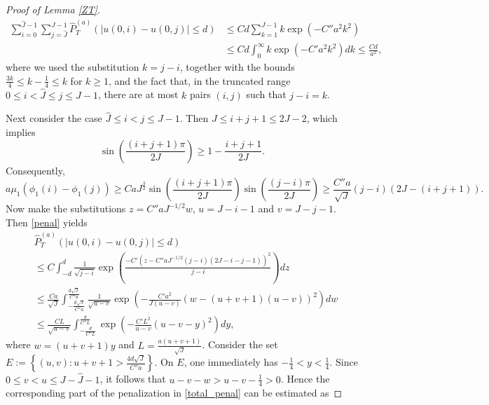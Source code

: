 \documentclass[12pt]{amsart}
\numberwithin{equation}{section}
\newcommand{\1}{\mathbf{1}}
\begin{document}
\begin{proof}[Proof of Lemma \ref{ZT}]
    \begin{equation}
    \label{penal_1}
        \begin{split}
            \sum_{i=0}^{\hat{J}-1}\sum_{j=\hat{J}}^{J-1}\widehat{P}_T^{(a)}(\vert u(0,i)-u(0,j)\vert\leq d)&\leq Cd\sum_{k=1}^{J-1}k\exp\left(-C''a^2k^2\right)\\
            &\leq Cd\int_0^\infty k\exp\left(-C'a^2k^2\right)dk\leq \frac{Cd}{a^2},
        \end{split}
    \end{equation}
    where we used the substitution $k=j-i$, together with the bounds $\frac{3k}{4}\leq k-\frac{1}{4}\leq k$ for $k\geq 1$, and the fact that, in the truncated range $0\le i<\hat{J}\le j\le J-1$, there are at most $k$ pairs $(i,j)$ such that $j-i=k$. 
    
    Next consider the case $\hat{J}\le i<j\le J-1$. Then $J\leq i+j+1\leq2J-2$, which implies
    \begin{equation*}
        \sin\left(\frac{(i+j+1)\pi}{2J}\right)\geq1-\frac{i+j+1}{2J}.
    \end{equation*}
    Consequently,
    \begin{equation*}
        a\mu_1(\phi_1(i)-\phi_1(j))\geq CaJ^{\frac{3}{2}}\sin\left(\frac{(i+j+1)\pi}{2J}\right)\sin\left(\frac{(j-i)\pi}{2J}\right)\geq \frac{C''a}{\sqrt{J}}(j-i)(2J-(i+j+1)).
    \end{equation*}
    Now make the substitutions $z = C''aJ^{-1/2}w$, $u=J-i-1$ and $v=J-j-1$. Then \eqref{penal} yields
    \begin{equation}
    \label{penal_2}
        \begin{split}
            &\widehat{P}^{(a)}_T(|u(0,i)-u(0,j)|\leq d)\\
            &\leq C\int_{-d}^d\frac{1}{\sqrt{j-i}}\exp\left(\frac{-C'(z-C''aJ^{-1/2}(j-i)(2J-i-j-1))^2}{j-i}\right)dz\\
            &\leq \frac{Ca}{\sqrt{J}}\int_{-\frac{d\sqrt{J}}{C''a}}^{\frac{d\sqrt{J}}{C''a}}\frac{1}{\sqrt{u-v}}\exp\left(-\frac{C'a^2}{J(u-v)}(w-(u+v+1)(u-v))^2\right)dw\\
            &\leq \frac{CL}{\sqrt{u-v}}\int_{-\frac{d}{C''L}}^{\frac{d}{C''L}}\exp\left(-\frac{C'L^2}{u-v}(u-v-y)^2\right)dy,
        \end{split}
    \end{equation}
    where $w = (u+v+1)y$ and $L=\frac{a(u+v+1)}{\sqrt{J}}$. Consider the set $E:=\left\lbrace (u,v):u+v+1>\frac{4d\sqrt{J}}{C''a}\right\rbrace$. On $E$, one immediately has $-\frac{1}{4}<y<\frac{1}{4}$. Since $0\leq v<u\leq J-\hat{J}-1$, it follows that $u-v-w>u-v-\frac{1}{4}>0$. Hence the corresponding part of the penalization in \eqref{total_penal} can be estimated as

\end{proof}
\end{document}
